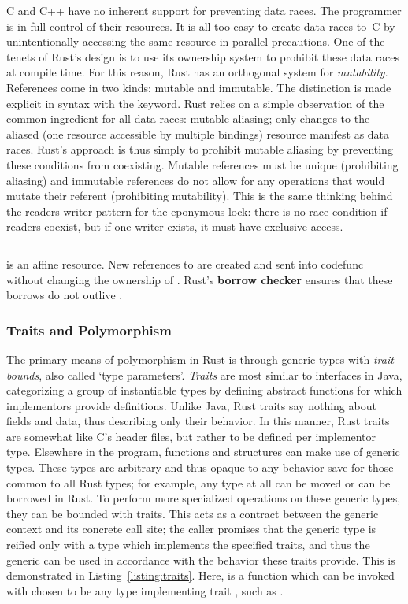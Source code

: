 C and C++ have no inherent support for preventing data races. The programmer is in full control of their resources. It is all too easy to create data races to~C by unintentionally accessing the same resource in parallel precautions. One of the tenets of Rust's design is to use its ownership system to prohibit these data races at compile time. For this reason, Rust has an orthogonal system for \textit{mutability}. References come in two kinds: mutable and immutable. The distinction is made explicit in syntax with the  keyword. Rust relies on a simple observation of the common ingredient for all data races: mutable aliasing; only changes to the aliased (one resource accessible by multiple bindings) resource manifest as data races. Rust's approach is thus simply to prohibit mutable aliasing by preventing these conditions from coexisting. Mutable references must be unique (prohibiting aliasing) and immutable references do not allow for any operations that would mutate their referent (prohibiting mutability). This is the same thinking behind the readers-writer pattern for the eponymous lock: there is no race condition if readers coexist, but if one writer exists, it must have exclusive access. 




\begin{listing}[ht]
	\centering
	\inputminted[]{rust}{move2.rs}
	\caption[Example of borrowing in Rust.]{ is an affine resource. New references to  are created and sent into code{func} without changing the ownership of . Rust's \textbf{borrow checker} ensures that these borrows do not outlive .}
	\label{listing:move2}
\end{listing}

\subsubsection{Traits and Polymorphism}
The primary means of polymorphism in Rust is through generic types with \textit{trait bounds}, also called `type parameters'. \textit{Traits} are most similar to interfaces in Java, categorizing a group of instantiable types by defining abstract functions for which implementors provide definitions. Unlike Java, Rust traits say nothing about fields and data, thus describing only their behavior. In this manner, Rust traits are somewhat like C's header files, but rather to be defined per implementor type. Elsewhere in the program, functions and structures can make use of generic types. These types are arbitrary and thus opaque to any behavior save for those common to all Rust types; for example, any type at all can be moved or can be borrowed in Rust. To perform more specialized operations on these generic types, they can be bounded with traits. This acts as a contract between the generic context and its concrete call site; the caller promises that the generic type is reified only with a type which implements the specified traits, and thus the generic can be used in accordance with the behavior these traits provide. This is demonstrated in Listing~\ref{listing:traits}. Here,  is a function which can be invoked with  chosen to be any type implementing trait , such as . 

